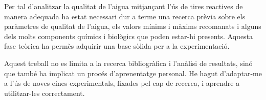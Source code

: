

Per tal d'analitzar la qualitat de l’aigua mitjançant l’ús de tires reactives  de manera adequada ha estat necessari dur a terme una recerca prèvia sobre els paràmetres de qualitat de l’aigua, els valors mínims i màxims recomanats i alguns dels molts components químics i biològics que poden estar-hi presents. Aquesta fase teòrica ha permès adquirir una base sòlida per a la experimentació.

Aquest treball no es limita a la recerca bibliogràfica i l’anàlisi de resultats, sinó que també ha implicat un procés d’aprenentatge personal. He hagut d’adaptar-me a l’ús de noves eines experimentals, fixades pel cap de recerca, i aprendre a utilitzar-les correctament.

%

